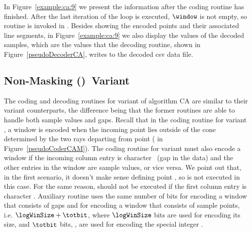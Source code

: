 

\clearpage


In Figure~\ref{example:ca:9} we present the information after the coding routine has finished. After the last iteration of the loop is executed, $\window$ is not empty, so routine \CAWinEnd is invoked in . Besides showing the encoded points and their associated line segments, in Figure~\ref{example:ca:9} we also display the values of the decoded samples, which are the values that the decoding routine, shown in Figure~\ref{pseudoDecoderCA}, writes to the decoded csv data file. 






\vspace{-10pt}
\subsection{Non-Masking (\NOmaskalgo)\ Variant}
\label{algo:ca:nmvariant}


The coding and decoding routines for variant \NOmaskalgo of algorithm CA are similar to their variant \maskalgo counterparts, the difference being that the former routines are able to handle both sample values and gaps. Recall that in the coding routine for variant \maskalgo, a window is encoded when the incoming point lies outside of the cone determined by the two rays departing from point \archived ( in Figure~\ref{pseudoCoderCAM}). The coding routine for variant \NOmaskalgo must also encode a window if the incoming column entry is character \noData\ (gap in the data) and the other entries in the window are sample values, or vice versa. We point out that, in the first scenario, it doesn't make sense defining point \archived, so  is not executed in this case. For the same reason,  should not be executed if the first column entry is character \noData. Auxiliary routine \CAWinEnd uses the same number of bits for encoding a window that consists of gaps and for encoding a window that consists of sample points, i.e. $\logWinSize+\totbit$, where $\logWinSize$ bits are used for encoding its size, and $\totbit$ bits, \wheretotbit, are used for encoding the special integer \nodata. 


